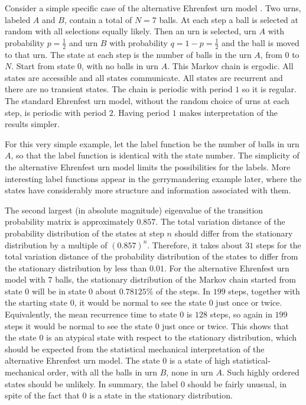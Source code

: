 \documentclass[12pt]{article}
\begin{document}
\begin{example}
    Consider a simple specific case of the alternative Ehrenfest urn
    model%
.    Two urns, labeled \( A \) and \( B \), contain a total of \( N = 7 \)
    balls.  At each step a ball is selected at random with all selections equally
    likely.  Then an urn is selected, urn \( A \) with probability \( p
    = \frac{1}{2} \) and urn \( B \) with probability \( q = 1-p = \frac
    {1}{2} \) and the ball is moved to that urn.  The state at each step
    is the number of balls in the urn \( A \), from \( 0 \) to \( N \).
    Start from state \( 0 \), with no balls in urn \( A \).  This Markov
    chain is ergodic.  All states are accessible and all states
    communicate.  All states are recurrent and there are no transient
    states.  The chain is periodic with period \( 1 \) so it is
    regular.  The standard Ehrenfest urn model, without the random
    choice of urns at each step, is periodic with period \( 2 \). 
    Having period \( 1 \) makes interpretation of the results simpler.

    For this very simple example, let the label function be the number
    of balls in urn \( A \), so that the label function is identical
    with the state number.  The simplicity of the alternative Ehrenfest
    urn model limits the possibilities for the labels.  More interesting
    label functions appear in the gerrymandering example later, where
    the states have considerably more structure and information
    associated with them.

    The second largest (in absolute magnitude) eigenvalue of the
    transition probability matrix is approximately \( 0.857 \).  The
    total variation distance of the probability distribution of the
    states at step \( n \) should differ from the stationary
    distribution by a multiple of \( (0.857)^n \).  Therefore, it takes
    about \( 31 \) steps for the total variation distance of the
    probability distribution of the states to differ from the stationary
    distribution by less than \( 0.01 \).  For the alternative Ehrenfest
    urn model with \( 7 \) balls, the stationary distribution of the
    Markov chain started from state \( 0 \) will be in state \( 0 \)
    about \( 0.78125\% \) of the steps.  In \( 199 \) steps, together
    with the starting state \( 0 \), it would be normal to see the state
    \( 0 \) just once or twice.  Equivalently, the mean recurrence time
    to state \( 0 \) is \( 128 \) steps, so again in \( 199 \) steps it
    would be normal to see the state \( 0 \) just once or twice.  This
    shows that the state \( 0 \) is an atypical state with respect to
    the stationary distribution, which should be expected from the
    statistical mechanical interpretation of the alternative Ehrenfest
    urn model. The state \( 0 \) is a state of high
    statistical-mechanical order, with all the balls in urn \( B \),
    none in urn \( A \).  Such highly ordered states should be unlikely.
    In summary, the label \( 0 \) should be fairly unusual, in spite of
    the fact that \( 0 \) is a state in the stationary distribution.


\end{example}
\end{document}
